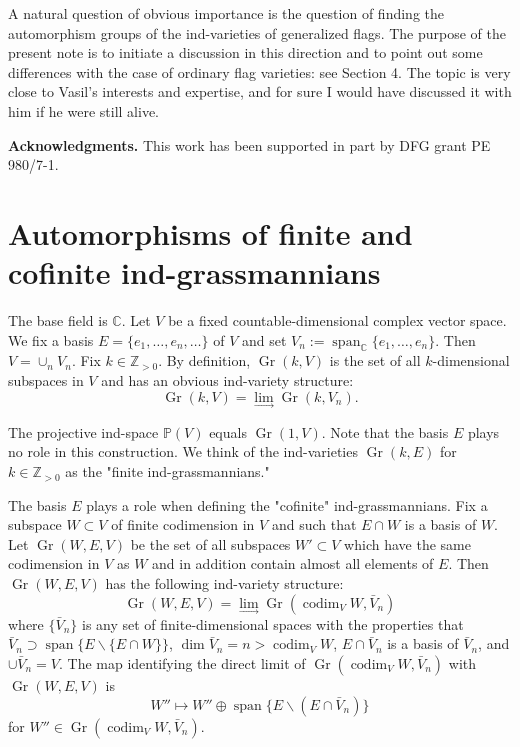 \documentclass[11pt,twoside]{gsp}
\begin{document}
A natural question of obvious importance is the question of finding the automorphism groups of the ind-varieties of generalized flags. The purpose of the present note is to initiate a discussion in this direction and to point out some differences with the case of ordinary flag varieties: see Section 4. The topic is very close to Vasil's interests and expertise, and for sure I would have discussed it with him if he were still alive.



{\bf Acknowledgments.} This work has been supported in part by DFG grant PE 980/7-1. 

\section{Automorphisms of finite and cofinite ind-grassmannians}

The base field is $\mathbb C$. Let $V$ be a fixed countable-dimensional complex vector space.  We fix a basis $E=\{e_1,\dots,e_n,\dots\}$ of $V$ and set $V_n:=\operatorname{span}_{\mathbb C}\{e_1,\dots,e_n\}$. Then $V=\cup_n V_n$. Fix $k\in \mathbb{Z}_{>0}$. By definition, $\operatorname{Gr}(k,V)$ is the set of all $k$-dimensional subspaces in $V$ and has an obvious ind-variety structure:
$$\operatorname{Gr}(k,V)=\lim_{\longrightarrow}\operatorname{Gr}(k,V_n).$$

The projective ind-space $\mathbb{P}(V)$ equals $\operatorname{Gr}(1,V)$. Note that the basis $E$ plays no role in this construction. We think  of the ind-varieties $\operatorname{Gr}(k,E)$ for $k\in\mathbb{Z}_{>0}$ as the "finite ind-grassmannians."

The basis $E$ plays a role when defining the "cofinite" ind-grassmannians. Fix a subspace $W\subset V$ of finite codimension in $V$ and such that $E\cap W$ is a basis of $W$. Let $\operatorname{Gr}(W,E,V)$ be the set of all subspaces $W'\subset V$ which have the same codimension in $V$ as $W$ and in addition contain almost all elements of $E$. Then $\operatorname{Gr}(W,E,V)$ has the following ind-variety structure:
$$\operatorname{Gr}(W,E,V)=\lim_{\longrightarrow}\operatorname{Gr} (\operatorname{codim}_V W, \bar V_n)$$
where $\{\bar V_n\}$ is any set of finite-dimensional spaces with the properties that $\bar V_n\supset\operatorname{span}\{E\backslash \{E\cap W\}\}$, $\operatorname{dim}\bar V_n=n>\operatorname{codim}_V W$, $E\cap \bar V_n$ is a basis of $\bar V_n$, and $\cup \bar V_n=V$. The map identifying the direct limit of $\operatorname{Gr} (\operatorname{codim}_V W, \bar V_n)$ with $\operatorname{Gr}(W,E,V)$ is 
$$W''\mapsto W''\oplus\operatorname{span}\{E\backslash(E\cap \bar V_{n})\}$$
for $W''\in \operatorname{Gr} (\operatorname{codim}_V W, \bar V_n)$.
\end{document}
